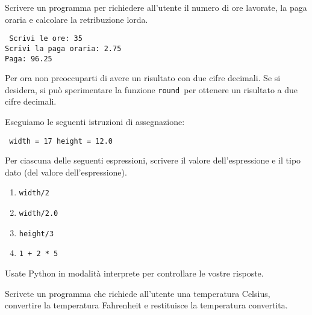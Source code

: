\begin{ex} Scrivere un programma per richiedere all'utente il numero di ore lavorate, la paga oraria e calcolare la retribuzione lorda.
\begin{verbatim} Scrivi le ore: 35 
Scrivi la paga oraria: 2.75 
Paga: 96.25 \end{verbatim} \end{ex}
%
Per ora non preoccuparti di avere un risultato con due cifre decimali. Se si desidera, si pu\`{o} sperimentare la funzione {\tt round }per ottenere un risultato a due cifre decimali.

\begin{ex} Eseguiamo le seguenti istruzioni di assegnazione:

\begin{verbatim} width = 17 height = 12.0 \end{verbatim}

Per ciascuna delle seguenti espressioni, scrivere il valore dell'espressione e il tipo dato (del valore dell'espressione).

\begin{enumerate}

\item {\tt width/2}

\item {\tt width/2.0}

\item {\tt height/3}

\item {\tt 1 + 2 * 5}

\end{enumerate}

Usate Python in modalit\`{a} interprete per controllare le vostre risposte.
\end{ex}

\begin{ex} Scrivete un programma che richiede all'utente una temperatura Celsius, convertire la temperatura Fahrenheit e restituisce la temperatura convertita.
\end{ex}


